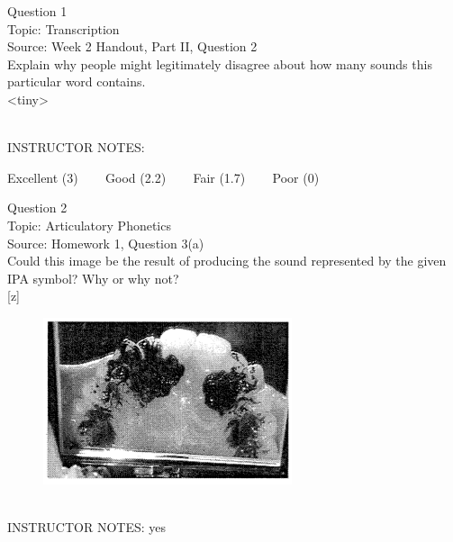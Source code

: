 \documentclass[12pt]{article}
\begin{document}
\begin{center}
\textbf{{\color{blue}{\HUGE START OF EXAM\\}}}

\textbf{{\color{blue}{\HUGE Student ID: 38245\\}}}

\textbf{{\color{blue}{\HUGE \\}}}

\end{center}
\newpage

{\large Question 1}\\

Topic: Transcription\\
Source: Week 2 Handout, Part II, Question 2\\

Explain why people might legitimately disagree about how many sounds this particular word contains.\\

<tiny>


~\\
INSTRUCTOR NOTES: 


\vfill
Excellent (3) ~~~ Good (2.2) ~~~ Fair (1.7) ~~~ Poor (0)
\newpage

{\large Question 2}\\

Topic: Articulatory Phonetics\\
Source: Homework 1, Question 3(a)\\

Could this image be the result of producing the sound represented by the given IPA symbol? Why or why not?\\

{[z]}

\begin{figure}[H]
\includegraphics{../images/staticpalatography_fricative.png}
\end{figure}

~\\
INSTRUCTOR NOTES: yes
\end{document}
